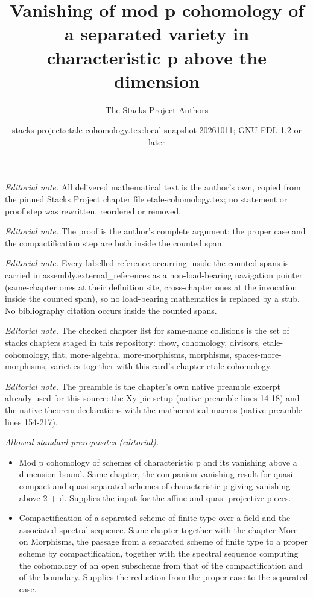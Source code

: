 \documentclass[10pt,a4paper]{amsart}
\title{Vanishing of mod p cohomology of a separated variety in characteristic p above the dimension}
\author{The Stacks Project Authors}
\date{stacks-project:etale-cohomology.tex:local-snapshot-20261011; GNU FDL 1.2 or later}
\theoremstyle{plain}
\theoremstyle{definition}
\theoremstyle{remark}
\numberwithin{equation}{subsection}
\begin{document}
\maketitle
\noindent\textit{Editorial note.} All delivered mathematical text is the author's own, copied from the pinned Stacks Project chapter file etale-cohomology.tex; no statement or proof step was rewritten, reordered or removed.\par\medskip
\noindent\textit{Editorial note.} The proof is the author's complete argument; the proper case and the compactification step are both inside the counted span.\par\medskip
\noindent\textit{Editorial note.} Every labelled reference occurring inside the counted spans is carried in assembly.external\_references as a non-load-bearing navigation pointer (same-chapter ones at their definition site, cross-chapter ones at the invocation inside the counted span), so no load-bearing mathematics is replaced by a stub. No bibliography citation occurs inside the counted spans.\par\medskip
\noindent\textit{Editorial note.} The checked chapter list for same-name collisions is the set of stacks chapters staged in this repository: chow, cohomology, divisors, etale-cohomology, flat, more-algebra, more-morphisms, morphisms, spaces-more-morphisms, varieties together with this card's chapter etale-cohomology.\par\medskip
\noindent\textit{Editorial note.} The preamble is the chapter's own native preamble excerpt already used for this source: the Xy-pic setup (native preamble lines 14-18) and the native theorem declarations with the mathematical macros (native preamble lines 154-217).\par\medskip
\noindent\textit{Allowed standard prerequisites (editorial).}\begin{itemize}
\item Mod p cohomology of schemes of characteristic p and its vanishing above a dimension bound. Same chapter, the companion vanishing result for quasi-compact and quasi-separated schemes of characteristic p giving vanishing above 2 + d. Supplies the input for the affine and quasi-projective pieces.
\item Compactification of a separated scheme of finite type over a field and the associated spectral sequence. Same chapter together with the chapter More on Morphisms, the passage from a separated scheme of finite type to a proper scheme by compactification, together with the spectral sequence computing the cohomology of an open subscheme from that of the compactification and of the boundary. Supplies the reduction from the proper case to the separated case.
\end{itemize}\medskip
\end{document}

